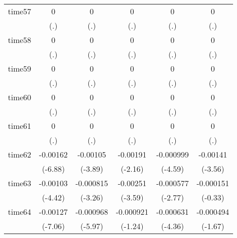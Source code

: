 \begin{table}[htbp]
\begin{tabular}{l*{5}{c}}
time57      &           0         &           0         &           0         &           0         &           0         \\
            &         (.)         &         (.)         &         (.)         &         (.)         &         (.)         \\
time58      &           0         &           0         &           0         &           0         &           0         \\
            &         (.)         &         (.)         &         (.)         &         (.)         &         (.)         \\
time59      &           0         &           0         &           0         &           0         &           0         \\
            &         (.)         &         (.)         &         (.)         &         (.)         &         (.)         \\
time60      &           0         &           0         &           0         &           0         &           0         \\
            &         (.)         &         (.)         &         (.)         &         (.)         &         (.)         \\
time61      &           0         &           0         &           0         &           0         &           0         \\
            &         (.)         &         (.)         &         (.)         &         (.)         &         (.)         \\
time62      &    -0.00162\sym{***}&    -0.00105\sym{***}&    -0.00191\sym{*}  &   -0.000999\sym{***}&    -0.00141\sym{***}\\
            &     (-6.88)         &     (-3.89)         &     (-2.16)         &     (-4.59)         &     (-3.56)         \\
time63      &    -0.00103\sym{***}&   -0.000815\sym{**} &    -0.00251\sym{***}&   -0.000577\sym{**} &   -0.000151         \\
            &     (-4.42)         &     (-3.26)         &     (-3.59)         &     (-2.77)         &     (-0.33)         \\
time64      &    -0.00127\sym{***}&   -0.000968\sym{***}&   -0.000921         &   -0.000631\sym{***}&   -0.000494         \\
            &     (-7.06)         &     (-5.97)         &     (-1.24)         &     (-4.36)         &     (-1.67)         \\

\end{tabular}
\end{table}
